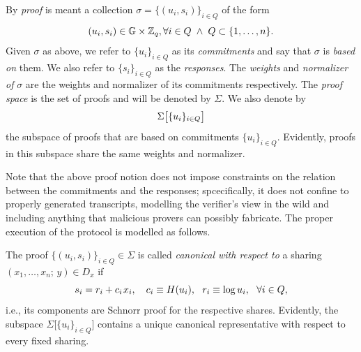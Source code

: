 \documentclass{iacrtrans}
\begin{document}
\begin{defn}\label{orst_proof_def}
By \textit{proof} is meant a collection
$\sigma = \{(u_i, s_i)\}_{i \in Q}$ of the form
\vspace{5pt}
\begin{equation*}\label{orst_proof_form}
(u_i, s_i) \in \mathbb{G} \times \mathbb{Z}_q,
\vspace{2pt}\forall i \in Q
\hspace{3pt}
\land
\hspace{3pt}
Q \subset \{1, \dots, n\}.
\vspace{5pt}
\end{equation*}
Given $\sigma$ as above, we refer to
$\{u_i\}_{i \in Q}$ as its \textit{commitments} and
say that $\sigma$ is \textit{based on} them.
We also refer to $\{s_i\}_{i \in Q}$ as the
\textit{responses}.
The \textit{weights} and \textit{normalizer of} $\sigma$
are the weights and normalizer of its commitments respectively.
The \textit{proof space}
is the set of proofs and will be denoted by $\Sigma$.
We also denote by
\vspace{5pt}
\begin{equation*}\label{orst_proofs_on_commitments}
\Sigma\big[\{u_i\}_{i \in Q}\big]
\vspace{5pt}
\end{equation*}
the subspace of proofs that are
based on commitments $\{u_i\}_{i \in Q}$.
Evidently, proofs in this subspace
share the same weights and normalizer.
\end{defn}

\noindent
Note that the above proof notion does not impose
constraints on the relation between
the commitments and the responses;
spcecifically, it does not confine
to properly generated transcripts,
modelling the verifier's view in the wild
and including anything that malicious provers can possibly fabricate.
The proper execution of the protocol
is modelled as follows.

\begin{defn}\label{orst_canonical_def}
The proof $\{(u_i, s_i)\}_{i \in Q} \in \Sigma$ is called
\textit{canonical with respect to} a sharing
$(x_1, \dots, x_n;\hspace{2pt} y) \in D_x$ if
\vspace{5pt}
\begin{equation}\label{orst_canonical}
s_i = r_i + c_i \hspace{1pt} x_i,
\ \ \ c_i \equiv H(u_i),
\ \ r_i \equiv \log u_i,
\ \ \forall i \in Q,
\vspace{5pt}
\end{equation}
i.e., its components are Schnorr proof
for the respective shares.
Evidently, the subspace $\Sigma\big[\{u_i\}_{i \in Q}\big]$
contains a unique canonical representative
with respect to every fixed sharing.
\end{defn}
\end{document}

